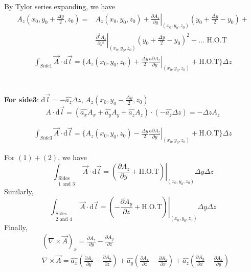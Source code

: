 \documentclass[12pt, a4paper]{article}
\begin{document}
By Tylor series expanding, we have
\begin{align*}
	A_z(x_0, y_0 + \frac{\Delta y}{2}, z_0) 
	= &A_z(x_0, y_0, z_0) + \left. \frac{\partial A_z}{\partial y} \right |_{(x_0, y_0, z_0)} (y_0+\frac{\Delta y}{2}-y_0) +\\
	& \left. \frac{\partial^2 A_z}{\partial y^2} \right |_{(x_0, y_0, z_0)} (y_0 + \frac{\Delta y}{2} -y_0)^2 + \text{... H.O.T}
\end{align*}
\begin{align}
	\int_{Side1} \vec{A} \cdot \text{d} \vec{l} = \{A_z(x_0, y_0, z_0) + \frac{\Delta y}{2} \left. \frac{a\partial A_z}{\partial y} \right |_{(x_0, y_0, z_0)} + \text{H.O.T}\} \Delta z
\end{align}
\\ \\

\textbf{For side3}: $\text{d} \vec{l} = -\hat{a_z} \Delta z$, \quad $A_z(x_0, y_0 - \frac{\Delta y}{2}, z_0)$ \\
$$
	A \cdot \text{d} \vec{l} = (\hat{a_x}A_x + \hat{a_y}A_y + \hat{a_z}A_z) \cdot (-\hat{a_z} \Delta z) = -\Delta z A_z 
$$

\begin{align}
	\int_{Side3} \vec{A} \cdot \text{d} \vec{l} = \{A_z(x_0, y_0, z_0) - \frac{\Delta y}{2} \left. \frac{a\partial A_z}{\partial y} \right |_{(x_0, y_0, z_0)} + \text{H.O.T}\} \Delta z
\end{align}

For $(1) + (2)$, we have
$$
\int_{\substack{\text{Sides} \\ \text{1 and 3}}} \vec{A} \cdot \text{d} \vec{l} = \left. (\frac{\partial A_z}{\partial y} + \text{H.O.T}) \right |_{(x_0, y_0, z_0)} \Delta y \Delta z
$$
Similarly,
$$
\int_{\substack{\text{Sides} \\ \text{2 and 4}}} \vec{A} \cdot \text{d} \vec{l} = \left. (-\frac{\partial A_y}{\partial z} + \text{H.O.T}) \right |_{(x_0, y_0, z_0)} \Delta y \Delta z
$$
Finally,
\begin{align*}
	&(\nabla \times \vec{A})_x = \frac{\partial A_z}{\partial y} - \frac{\partial A_y}{\partial z} \\
	&\nabla \times \vec{A} = \hat{a_x}(\frac{\partial A_z}{\partial y} - \frac{\partial A_y}{\partial z}) + \hat{a_y}(\frac{\partial A_x}{\partial z} - \frac{\partial A_z}{\partial x}) + \hat{a_z}(\frac{\partial A_y}{\partial x} - \frac{\partial A_x}{\partial y})\\
\end{align*}
\newpage
\end{document}
